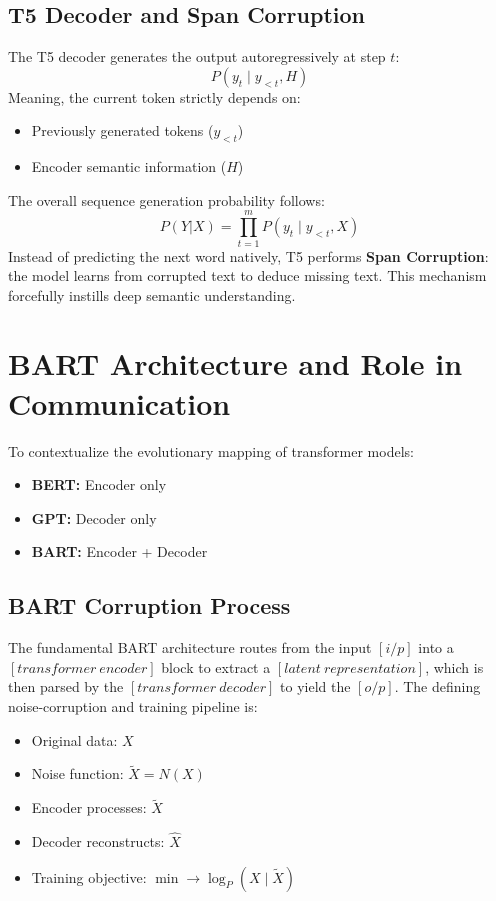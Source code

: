 \documentclass[10pt, conference]{IEEEtran}
\begin{document}
\subsection{\textbf{T5 Decoder and Span Corruption}}
The T5 decoder generates the output autoregressively at step $t$:
\begin{equation}
    P(y_t \mid y_{<t}, H)
\end{equation}
Meaning, the current token strictly depends on:
\begin{itemize}
    \item Previously generated tokens ($y_{<t}$)
    \item Encoder semantic information ($H$)
\end{itemize}
The overall sequence generation probability follows:
\begin{equation}
    P(Y|X) = \prod_{t=1}^{m} P(y_t \mid y_{<t}, X)
\end{equation}
Instead of predicting the next word natively, T5 performs \textbf{Span Corruption}: the model learns from corrupted text to deduce missing text. This mechanism forcefully instills deep semantic understanding.


\section{\large \textbf{BART Architecture and Role in Communication}}
To contextualize the evolutionary mapping of transformer models:
\begin{itemize}
    \item \textbf{BERT:} Encoder only
    \item \textbf{GPT:} Decoder only
    \item \textbf{BART:} Encoder + Decoder
\end{itemize}

\subsection{\textbf{BART Corruption Process}}
The fundamental BART architecture routes from the input $[i/p]$ into a $[transformer\ encoder]$ block to extract a $[latent\ representation]$, which is then parsed by the $[transformer\ decoder]$ to yield the $[o/p]$. The defining noise-corruption and training pipeline is:
\begin{itemize}
    \item Original data: $X$
    \item Noise function: $\tilde{X} = N(X)$
    \item Encoder processes: $\tilde{X}$
    \item Decoder reconstructs: $\hat{X}$
    \item Training objective: $\min \rightarrow \log_P(X \mid \tilde{X})$
\end{itemize}
\end{document}
